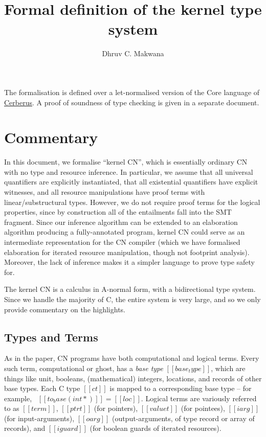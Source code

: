 \documentclass[11pt]{article}%
\title{\vspace{-2cm} Formal definition of the kernel type system}
\author{Dhruv C. Makwana}
\date{}
\begin{document}
\maketitle%


\noindent
The formalisation is defined
over a let-normalised version of the Core language of
\href{https://github.com/rems-project/cerberus}{Cerberus}. A proof of soundness
of type checking is given in a separate document.

{\let\clearpage\relax \tableofcontents}

\section{Commentary}
\label{sec:commentary}

In this document, we formalise ``kernel CN'',
which is essentially ordinary CN with no type and
resource inference. In particular, we assume that all
universal quantifiers are explicitly instantiated, that all
existential quantifiers have explicit witnesses, and all resource
manipulations have proof terms with linear/substructural
types. However, we do not require proof terms for the logical
properties, since by construction all of the entailments fall
into the SMT fragment. Since our inference algorithm can be extended
to an elaboration algorithm producing a fully-annotated program,
kernel CN could serve as an intermediate representation for the CN
compiler (which we have formalised elaboration for iterated resource
manipulation, though not footprint analysis).
Moreover, the lack of inference makes it a simpler language
to prove type safety for.

The kernel CN is a calculus in A-normal form, with a bidirectional
type system. Since we handle the majority of C, the entire system is very
large, and so we only provide commentary on the highlights.

\subsection{Types and Terms}

As in the paper, CN programs have both computational and logical terms.
Every such term, computational or ghost, has a \emph{base type} $[[ base_type ]]$,
which are things like unit, booleans, (mathematical) integers, locations,
and records of other base types. Each C type $[[ ct ]]$ is mapped to a
corresponding base type -- for example, \ $[[ to_base ( int * ) ]] = [[ loc ]]$.
Logical terms are variously referred to as $[[ term ]]$, $[[ ptrt ]]$
(for pointers), $[[ valuet ]]$ (for pointees), $[[ iarg ]]$ (for
input-arguments), $[[ oarg ]]$ (output-arguments, of type record or array of
records), and $[[ iguard ]]$ (for boolean guards of iterated resources).
\end{document}
